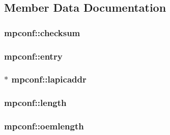 \subsection{Member Data Documentation}
\subsubsection[{\texorpdfstring{checksum}{checksum}}]{ mpconf\+::checksum}\hypertarget{structmpconf_aac54c4c7710b90574416a945cdcd3b9e}{}\label{structmpconf_aac54c4c7710b90574416a945cdcd3b9e}
\subsubsection[{\texorpdfstring{entry}{entry}}]{ mpconf\+::entry}\hypertarget{structmpconf_a75f67295a180d1f72b93be82e09ecc2a}{}\label{structmpconf_a75f67295a180d1f72b93be82e09ecc2a}
\subsubsection[{\texorpdfstring{lapicaddr}{lapicaddr}}]{$\ast$ mpconf\+::lapicaddr}\hypertarget{structmpconf_a087fac7e9dc4ca1fdfe142b3adf96c99}{}\label{structmpconf_a087fac7e9dc4ca1fdfe142b3adf96c99}
\subsubsection[{\texorpdfstring{length}{length}}]{ mpconf\+::length}\hypertarget{structmpconf_a6b7583180c78b6a2e490d6c72779d8dd}{}\label{structmpconf_a6b7583180c78b6a2e490d6c72779d8dd}
\subsubsection[{\texorpdfstring{oemlength}{oemlength}}]{ mpconf\+::oemlength}\hypertarget{structmpconf_a5aaf9c7afa2f1be645b8e633f6ff43a1}{}\label{structmpconf_a5aaf9c7afa2f1be645b8e633f6ff43a1}
